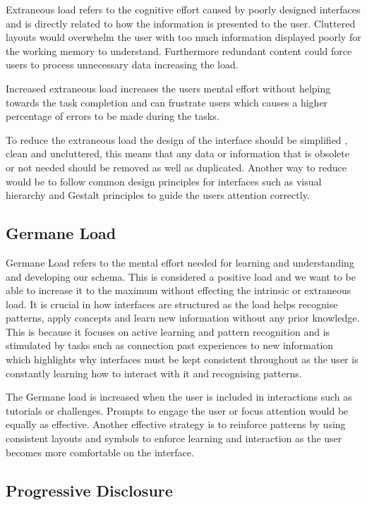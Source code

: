 \documentclass[]{project_interim}
\begin{document}
Extraneous load refers to the cognitive effort caused by poorly designed interfaces and is directly related to how the information is presented to the user. Cluttered layouts would overwhelm the user with too much information displayed poorly for the working memory to understand. Furthermore redundant content could force users to process unnecessary data increasing the load.

Increased extraneous load increases the users mental effort without helping towards the task completion and can frustrate users which causes a higher percentage of errors to be made during the tasks.

To reduce the extraneous load the design of the interface should be simplified , clean and uncluttered, this means that any data or information that is obsolete or not needed should be removed as well as duplicated. Another way to reduce would be to follow common design principles for interfaces such as visual hierarchy and Gestalt principles to guide the users attention correctly.\cite{todorovic_gestalt_2008}\cite{moller_what_2012}

\subsection{Germane Load}

Germane Load refers to the mental effort needed for learning and understanding and developing our schema. This is considered a positive load and we want to be able to increase it to the maximum without effecting the intrinsic or extraneous load. It is crucial in how interfaces are structured as the load helps recognise patterns, apply concepts and learn new information without any prior knowledge. This is because it focuses on active learning and pattern recognition and is stimulated by tasks such as connection past experiences to new information which highlights why interfaces must be kept consistent throughout as the user is constantly learning how to interact with it and recognising patterns.

The Germane load is increased when the user is included in interactions such as tutorials or challenges. Prompts to engage the user or focus attention would be equally as effective. Another effective strategy is to reinforce patterns by using consistent layouts and symbols to enforce learning and interaction as the user becomes more comfortable on the interface.

\subsection{Progressive Disclosure}
\end{document}
